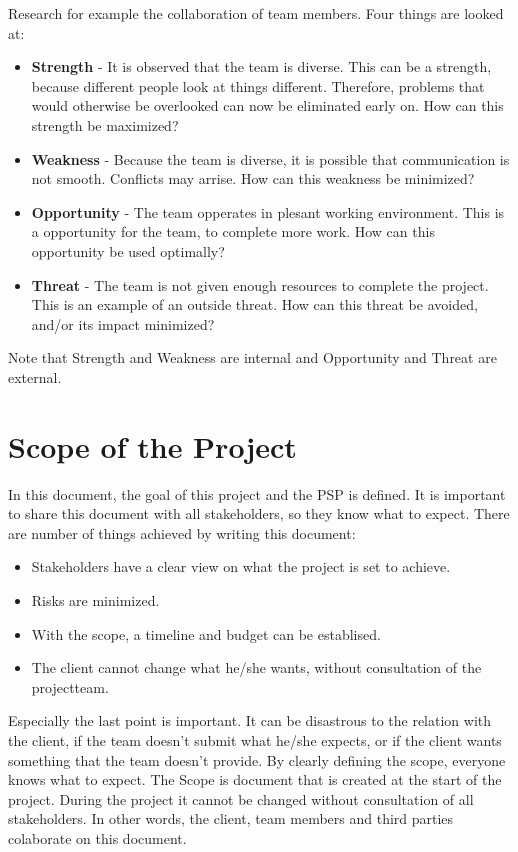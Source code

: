 \documentclass[10pt]{report}
\begin{document}
Research for example the collaboration of team members. Four things are looked at:

\begin{itemize}
	\item \textbf{Strength} - It is observed that the team is diverse. This can be a strength, because different people look at things different. Therefore, problems that would otherwise be overlooked can now be eliminated early on. How can this strength be maximized?
	\item \textbf{Weakness} - Because the team is diverse, it is possible that communication is not smooth. Conflicts may arrise. How can this weakness be minimized?
	\item \textbf{Opportunity} - The team opperates in plesant working environment. This is a opportunity for the team, to complete more work. How can this opportunity be used optimally?
	\item \textbf{Threat} - The team is not given enough resources to complete the project. This is an example of an outside threat. How can this threat be avoided, and/or its impact minimized?
\end{itemize}

Note that Strength and Weakness are internal and Opportunity and Threat are external.

\newpage

\section{Scope of the Project}

In this document, the goal of this project and the PSP is defined. It is important to share this document with all stakeholders, so they know what to expect. There are number of things achieved by writing this document:

\begin{itemize}
	\item Stakeholders have a clear view on what the project is set to achieve.
	\item Risks are minimized.
	\item With the scope, a timeline and budget can be establised.
	\item The client cannot change what he/she wants, without consultation of the projectteam.
\end{itemize}

Especially the last point is important. It can be disastrous to the relation with the client, if the team doesn't submit what he/she expects, or if the client wants something that the team doesn't provide. By clearly defining the scope, everyone knows what to expect. The Scope is document that is created at the start of the project. During the project it cannot be changed without consultation of all stakeholders. In other words, the client, team members and third parties colaborate on this document.	
\end{document}
